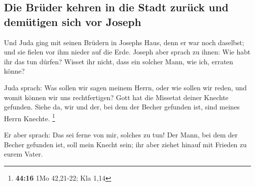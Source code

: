 \hypertarget{die-bruxfcder-kehren-in-die-stadt-zuruxfcck-und-demuxfctigen-sich-vor-joseph}{%
\subsection{Die Brüder kehren in die Stadt zurück und demütigen sich vor
Joseph}\label{die-bruxfcder-kehren-in-die-stadt-zuruxfcck-und-demuxfctigen-sich-vor-joseph}}

 Und Juda ging mit seinen Brüdern in Josephs Haus, denn
er war noch daselbst; und sie fielen vor ihm nieder auf die Erde.
 Joseph aber sprach zu ihnen: Wie habt ihr das tun
dürfen? Wisset ihr nicht, dass ein solcher Mann, wie ich, erraten könne?

 Juda sprach: Was sollen wir sagen meinem Herrn, oder wie
sollen wir reden, und womit können wir uns rechtfertigen? Gott hat die
Missetat deiner Knechte gefunden. Siehe da, wir und der, bei dem der
Becher gefunden ist, sind meines Herrn Knechte. \footnote{\textbf{44:16}
  1Mo 42,21-22; Kla 1,14}

 Er aber sprach: Das sei ferne von mir, solches zu tun!
Der Mann, bei dem der Becher gefunden ist, soll mein Knecht sein; ihr
aber ziehet hinauf mit Frieden zu eurem Vater.

